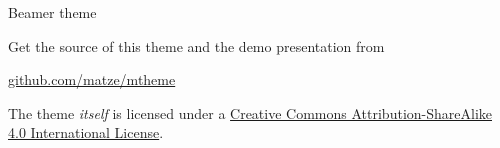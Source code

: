 \documentclass[10pt, compress]{beamer}		%
\begin{document}




\begin{frame}{Beamer theme}

  Get the source of this theme and the demo presentation from

  \begin{center}\url{github.com/matze/mtheme}\end{center}

  The theme \emph{itself} is licensed under a
  \href{http://creativecommons.org/licenses/by-sa/4.0/}{Creative Commons
  Attribution-ShareAlike 4.0 International License}.

  \begin{center}\ccbysa\end{center}

\end{frame}

\end{document}
